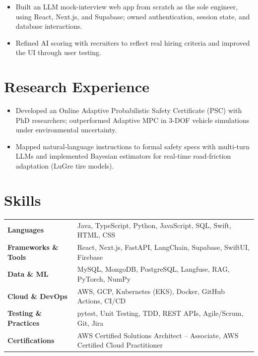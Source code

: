 \documentclass[11pt, letterpaper]{article}
\begin{document}
\vspace{1pt}
\begin{itemize}
  \item Built an LLM mock-interview web app from scratch as the sole engineer, using React, Next.js, and Supabase; owned authentication, session state, and database interactions.
  \item Refined AI scoring with recruiters to reflect real hiring criteria and improved the UI through user testing.
\end{itemize}

\section{Research Experience}
\begin{itemize}
  \item Developed an Online Adaptive Probabilistic Safety Certificate (PSC) with PhD researchers; outperformed Adaptive MPC in 3-DOF vehicle simulations under environmental uncertainty.
  \item Mapped natural-language instructions to formal safety specs with multi-turn LLMs and implemented Bayesian estimators for real-time road-friction adaptation (LuGre tire models).
\end{itemize}

\section{Skills}
\begin{tabularx}{\textwidth}{@{}l @{\hspace{7pt}} >{\raggedright\arraybackslash}X@{}}
  \textbf{Languages} & Java, TypeScript, Python, JavaScript, SQL, Swift, HTML, CSS \\[1pt]
  \textbf{Frameworks \& Tools} & React, Next.js, FastAPI, LangChain, Supabase, SwiftUI, Firebase \\[1pt]
  \textbf{Data \& ML} & MySQL, MongoDB, PostgreSQL, Langfuse, RAG, PyTorch, NumPy \\[1pt]
  \textbf{Cloud \& DevOps} & AWS, GCP, Kubernetes (EKS), Docker, GitHub Actions, CI/CD \\[1pt]
  \textbf{Testing \& Practices} & pytest, Unit Testing, TDD, REST APIs, Agile/Scrum, Git, Jira \\[1pt]
  \textbf{Certifications} & AWS Certified Solutions Architect -- Associate, AWS Certified Cloud Practitioner \\
\end{tabularx}
\end{document}
